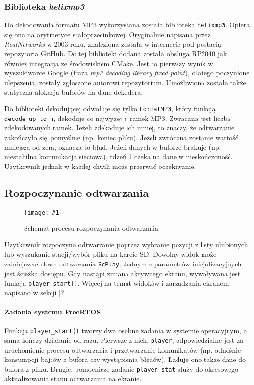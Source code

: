 \documentclass[12pt]{report}
\newcommand{\imgint}[4]{
	\begin{figure}[{#4}]
		\centering
		\texttt{[image: \#1]}
		\caption{#2}
		\label{#1}
	\end{figure}
}
\newcommand{\imgcs}[3]{\imgint{#1}{#2}{#3}{}}
\begin{document}
	\subsubsection{Biblioteka \textit{helixmp3}}
	Do dekodowania formatu MP3 wykorzystana została biblioteka \lstinline|helixmp3|. Opiera się ona na arytmetyce stałoprzecinkowej. Oryginalnie napisana przez \textit{RealNetworks}\textsuperscript{\cite{realnetworks}} w 2003 roku, znaleziona została w internecie pod postacią repozytoria GitHub\textsuperscript{\cite{helixmp3_repo}}. Do tej biblioteki dodana została obsługa RP2040 jak również integracja ze środowiskiem CMake. Jest to pierwszy wynik w wyszukiwarce Google (fraza \textit{mp3 decoding library fixed point}), dlatego poczynione ulepszenia, zostały zgłoszone autorowi repozytorium\textsuperscript{\cite{helixmp3_pr}}. Umożliwiona została także statyczna alokacja buforów na dane dekodera.
	
	Do biblioteki dekodującej odwołuje się tylko \lstinline|FormatMP3|, który funkcją \lstinline|decode_up_to_n|, dekoduje co najwyżej \lstinline|n| ramek MP3. Zwracana jest liczba zdekodowanych ramek. Jeżeli zdekoduje ich mniej, to znaczy, że odtwarzanie zakończyło się pomyślnie (np. koniec pliku). Jeżeli zwrócona zostanie wartość mniejsza od zera, oznacza to błąd. Jeżeli danych w buforze brakuje (np. niestabilna komunikacja sieciowa), rdzeń 1 czeka na dane w nieskończoność. Użytkownik jednak w każdej chwili może przerwać oczekiwanie.
	
	\subsection{Rozpoczynanie odtwarzania}
	\imgcs{3/PicoRadio-start}{Schemat procesu rozpoczynania odtwarzania}{0.7}
	Użytkownik rozpoczyna odtwarzanie poprzez wybranie pozycji z listy ulubionych lub wyszukanie stacji/wybór pliku na karcie SD. Dowolny widok może zainicjować ekran odtwarzania \lstinline|ScPlay|. Jednym z parametrów inicjalizacyjnych jest ścieżka dostępu. Gdy nastąpi zmiana aktywnego ekranu, wywoływana jest funkcja \lstinline|player_start()|. Więcej na temat widoków i zarządzania ekranem napisano w sekcji \ref{?}. %
	
	\paragraph{Zadania systemu FreeRTOS}
		Funkcja \lstinline|player_start()| tworzy dwa osobne zadania w systemie operacyjnym, a sama kończy działanie od razu. Pierwsze z nich, \lstinline|player|, odpowiedzialne jest za uruchomienie procesu odtwarzania i przetwarzanie komunikatów (np. odnośnie konsumpcji bajtów z bufora czy wystąpienia błędów). Ładuje ono także dane do bufora z pliku. Drugie, pomocnicze zadanie \lstinline|player stat| służy do okresowego aktualizowania stanu odtwarzania na ekranie.
	
\end{document}
